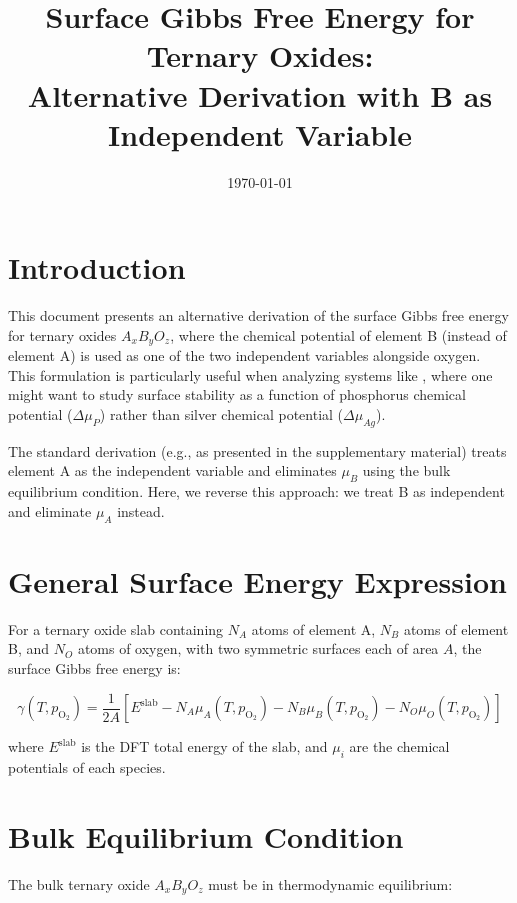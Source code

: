 \documentclass[11pt]{article}
\title{Surface Gibbs Free Energy for Ternary Oxides:\\
Alternative Derivation with B as Independent Variable}
\author{}
\date{\today}
\begin{document}
\maketitle

\section{Introduction}

This document presents an alternative derivation of the surface Gibbs free energy for ternary oxides $A_xB_yO_z$, where the chemical potential of element B (instead of element A) is used as one of the two independent variables alongside oxygen. This formulation is particularly useful when analyzing systems like , where one might want to study surface stability as a function of phosphorus chemical potential ($\Delta\mu_P$) rather than silver chemical potential ($\Delta\mu_{Ag}$).

The standard derivation (e.g., as presented in the supplementary material) treats element A as the independent variable and eliminates $\mu_B$ using the bulk equilibrium condition. Here, we reverse this approach: we treat B as independent and eliminate $\mu_A$ instead.

\section{General Surface Energy Expression}

For a ternary oxide slab containing $N_A$ atoms of element A, $N_B$ atoms of element B, and $N_O$ atoms of oxygen, with two symmetric surfaces each of area $A$, the surface Gibbs free energy is:

\begin{equation}
\gamma(T, p_{\text{O}_2}) = \frac{1}{2A} \left[ E^{\text{slab}} - N_A \mu_A(T, p_{\text{O}_2}) - N_B \mu_B(T, p_{\text{O}_2}) - N_O \mu_O(T, p_{\text{O}_2}) \right]
\label{eq:gamma_general}
\end{equation}

where $E^{\text{slab}}$ is the DFT total energy of the slab, and $\mu_i$ are the chemical potentials of each species.

\section{Bulk Equilibrium Condition}

The bulk ternary oxide $A_xB_yO_z$ must be in thermodynamic equilibrium:
\end{document}

